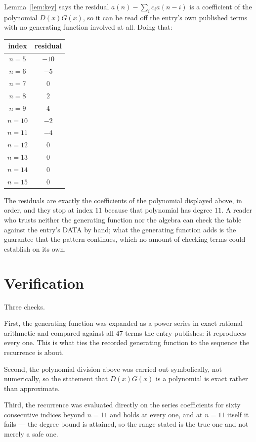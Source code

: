 \documentclass[11pt,a4paper]{article}
\theoremstyle{plain}
\theoremstyle{definition}
\begin{document}
Lemma~\ref{lem:key} says the residual $a(n)-\sum_ic_ia(n-i)$ is a coefficient of the
polynomial $D(x)G(x)$, so it can be read off the entry's own published terms with no
generating function involved at all. Doing that:
\begin{center}
\begin{tabular}{cc}
index & residual \\ \hline
$n=5$ & $-10$ \\
$n=6$ & $-5$ \\
$n=7$ & $0$ \\
$n=8$ & $2$ \\
$n=9$ & $4$ \\
$n=10$ & $-2$ \\
$n=11$ & $-4$ \\
$n=12$ & $0$ \\
$n=13$ & $0$ \\
$n=14$ & $0$ \\
$n=15$ & $0$
\end{tabular}
\end{center}
The residuals are exactly the coefficients of the polynomial displayed above, in order, and
they stop at index $11$ because that polynomial has degree $11$. A reader who trusts
neither the generating function nor the algebra can check the table against the entry's DATA
by hand; what the generating function adds is the guarantee that the pattern continues, which
no amount of checking terms could establish on its own.

\section{Verification}

Three checks.

First, the generating function was expanded as a power series in exact rational arithmetic and
compared against all $47$ terms the entry publishes: it reproduces every one. This is
what ties the recorded generating function to the sequence the recurrence is about.

Second, the polynomial division above was carried out symbolically, not numerically, so the
statement that $D(x)G(x)$ is a polynomial is exact rather than approximate.

Third, the recurrence was evaluated directly on the series coefficients for sixty consecutive
indices beyond $n=11$ and holds at every one, and at $n=11$ itself it fails --- the
degree bound is attained, so the range stated is the true one and not merely a safe one.
\end{document}
